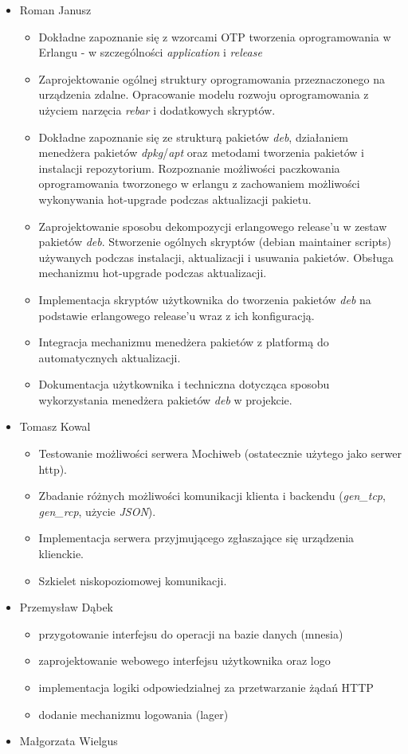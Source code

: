 \documentclass[polish,12pt]{aghthesis} \usepackage[utf8]{inputenc}
\begin{document}
\begin{itemize}
  \item Roman Janusz
  \begin{itemize}
    \item Dokładne zapoznanie się z wzorcami OTP tworzenia oprogramowania w Erlangu - w szczególności \emph{application} i \emph{release}
    \item Zaprojektowanie ogólnej struktury oprogramowania przeznaczonego na urządzenia zdalne. Opracowanie modelu rozwoju oprogramowania z użyciem narzęcia \emph{rebar} i dodatkowych skryptów.
    \item Dokładne zapoznanie się ze strukturą pakietów \emph{deb}, działaniem menedżera pakietów \emph{dpkg}/\emph{apt} oraz metodami tworzenia pakietów i instalacji repozytorium. Rozpoznanie możliwości paczkowania oprogramowania tworzonego w erlangu z zachowaniem możliwości wykonywania hot-upgrade podczas aktualizacji pakietu.
    \item Zaprojektowanie sposobu dekompozycji erlangowego release'u w zestaw pakietów \emph{deb}. Stworzenie ogólnych skryptów (debian maintainer scripts) używanych podczas instalacji, aktualizacji i usuwania pakietów. Obsługa mechanizmu hot-upgrade podczas aktualizacji.
    \item Implementacja skryptów użytkownika do tworzenia pakietów \emph{deb} na podstawie erlangowego release'u wraz z ich konfiguracją.
    \item Integracja mechanizmu menedżera pakietów z platformą do automatycznych aktualizacji.
    \item Dokumentacja użytkownika i techniczna dotycząca sposobu wykorzystania menedżera pakietów \emph{deb} w projekcie.
  \end{itemize}

  \item Tomasz Kowal
  \begin{itemize}
    \item Testowanie możliwości serwera Mochiweb (ostatecznie użytego jako serwer http).
    \item Zbadanie różnych możliwości komunikacji klienta i backendu (\emph{gen\_tcp}, \emph{gen\_rcp}, użycie \emph{JSON}).
    \item Implementacja serwera przyjmującego zgłaszające się urządzenia klienckie.
    \item Szkielet niskopoziomowej komunikacji.
  \end{itemize}
  \item Przemysław Dąbek
    \begin{itemize}
      \item przygotowanie interfejsu do operacji na bazie danych (mnesia)
      \item zaprojektowanie webowego interfejsu użytkownika oraz logo
      \item implementacja logiki odpowiedzialnej za przetwarzanie żądań HTTP
      \item dodanie mechanizmu logowania (lager)
    \end{itemize}
  \item Małgorzata Wielgus
\end{itemize}
\end{document}
